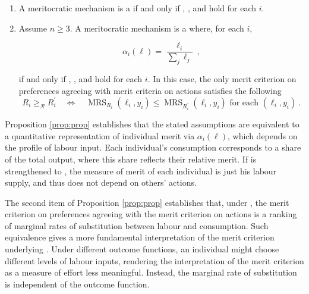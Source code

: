 \begin{prop}\label{prop:prop}

	\begin{enumerate}
		\item A meritocratic mechanism is a  if and only if , , and  hold for each \( i \).
		\item Assume \( n \geq 3 \). A meritocratic mechanism is a  where, for each \( i \),

		      \[ \alpha_i (\ell) = \frac{\ell_i}{\sum_j \ell_j} \: , \]

		      if and only if , , and  hold for each \( i \). In this case, the only merit criterion on preferences agreeing with merit criteria on actions satisfies the following
		      \[ R_i \geq_{\mathcal{R}} R_i^{\prime} \quad \Longleftrightarrow \quad \operatorname{MRS}_{R_i} ( \ell_i, y_i ) \leq \operatorname{MRS}_{R^{\prime}_i} ( \ell_i, y_i ) \text{ for each } ( \ell_i, y_i ) \: .\]
	\end{enumerate}
\end{prop}

Proposition \ref{prop:prop} establishes that the stated assumptions are equivalent to a quantitative representation of individual merit via \( \alpha_{i} (\ell) \), which depends on the profile of labour input. Each individual’s consumption corresponds to a share of the total output, where this share reflects their relative merit. If  is strengthened to , the measure of merit of each individual is just his labour supply, and thus does not depend on others' actions.

The second item of Proposition \ref{prop:prop} establishes that, under , the merit criterion on preferences agreeing with the merit criterion on actions is a ranking of marginal rates of substitution between labour and consumption. Such equivalence gives a more fundamental interpretation of the merit criterion underlying . Under different outcome functions, an individual might choose different levels of labour inputs, rendering the interpretation of the merit criterion as a measure of effort less meaningful. Instead, the marginal rate of substitution is independent of the outcome function.

